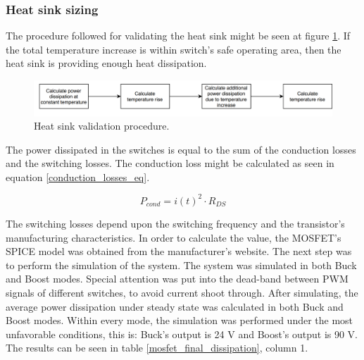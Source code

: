 \subsubsection{Heat sink sizing}

The procedure followed for validating the heat sink might be seen at figure \ref{heat_sink_validation_procedure}. If the total temperature increase is within switch's safe operating area, then the heat sink is providing enough heat dissipation.

\begin{figure}[htbp]
	\begin{center}
		\includegraphics[width=\textwidth]{../Pictures/P1/Component_sizing/heat_sink_validation_procedure.png}
		\caption{Heat sink validation procedure.}
		\label{heat_sink_validation_procedure}
	\end{center}	
\end{figure}

The power dissipated in the switches is equal to the sum of the conduction losses and the switching losses. The conduction loss might be calculated  as seen in equation \ref{conduction_losses_eq}.

\begin{equation} \label{conduction_losses_eq}
P_{cond} = i(t)^2 \cdot R_{DS}
\end{equation}

The switching losses depend upon the switching frequency and the transistor's manufacturing characteristics. In order to calculate the value, the MOSFET's SPICE model was obtained from the manufacturer's website. The next step was to perform the simulation of the system. The system was simulated in both Buck and Boost modes. Special attention was put into the dead-band between PWM signals of different switches, to avoid current shoot through. After simulating, the average power dissipation under steady state was calculated in both Buck and Boost modes. Within every mode, the simulation was performed under the most unfavorable conditions, this is: Buck's output is 24 V and Boost's output is 90 V. The results can be seen in table \ref{mosfet_final_dissipation}, column 1.

